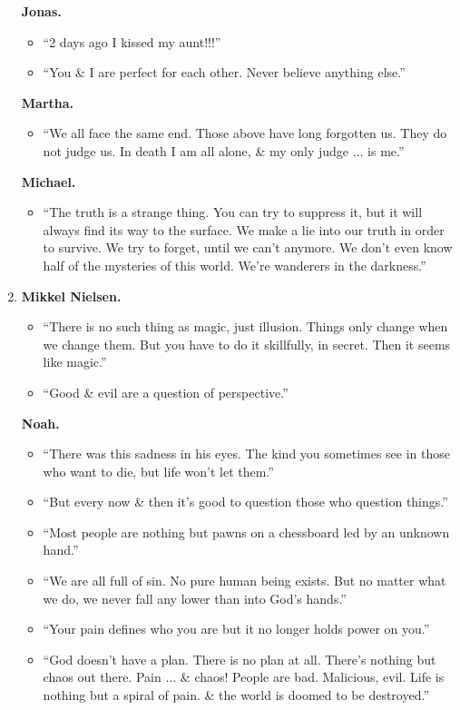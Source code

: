 \documentclass[oneside]{book}
\numberwithin{equation}{section}
\begin{document}
\begin{enumerate}
\begin{itemize}
	\end{itemize}
	\textbf{Jonas.}
	\begin{itemize}
		\item ``2 days ago I kissed my aunt!!!''
		\item ``You \& I are perfect for each other. Never believe anything else.''
	\end{itemize}
	\textbf{Martha.}
	\begin{itemize}
		\item ``We all face the same end. Those above have long forgotten us. They do not judge us. In death I am all alone, \& my only judge $\ldots$ is me.''
	\end{itemize}
	\textbf{Michael.}
	\begin{itemize}
		\item ``The truth is a strange thing. You can try to suppress it, but it will always find its way to the surface. We make a lie into our truth in order to survive. We try to forget, until we can't anymore. We don't even know half of the mysteries of this world. We're wanderers in the darkness.''
	\end{itemize}
	\item \textbf{Mikkel Nielsen.}
	\begin{itemize}
		\item ``There is no such thing as magic, just illusion. Things only change when we change them. But you have to do it skillfully, in secret. Then it seems like magic.''
		\item ``Good \& evil are a question of perspective.''
	\end{itemize}
	\textbf{Noah.}
	\begin{itemize}
		\item ``There was this sadness in his eyes. The kind you sometimes see in those who want to die, but life won't let them.''
		\item ``But every now \& then it's good to question those who question things.''
		\item ``Most people are nothing but pawns on a chessboard led by an unknown hand.''
		\item ``We are all full of sin. No pure human being exists. But no matter what we do, we never fall any lower than into God's hands.''
		\item ``Your pain defines who you are but it no longer holds power on you.''
		\item ``God doesn't have a plan. There is no plan at all. There's nothing but chaos out there. Pain $\ldots$ \& chaos! People are bad. Malicious, evil. Life is nothing but a spiral of pain. \& the world is doomed to be destroyed.''

\end{itemize}
\end{enumerate}
\end{document}
